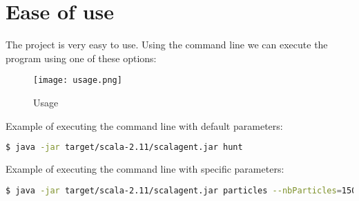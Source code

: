 \section{Ease of use}
\label{sec:Ease}
The project is very easy to use. 
Using the command line we can execute the program using one of these options:\\


\begin{figure}[H]
   \texttt{[image: usage.png]}
   \caption{Usage}
\end{figure}



Example of executing the command line with default parameters:
\begin{lstlisting}[language=bash]
  $ java -jar target/scala-2.11/scalagent.jar hunt
\end{lstlisting}

Example of executing the command line with specific parameters:
\begin{lstlisting}[language=bash]
  $ java -jar target/scala-2.11/scalagent.jar particles --nbParticles=15000 --toroidal=true
\end{lstlisting}